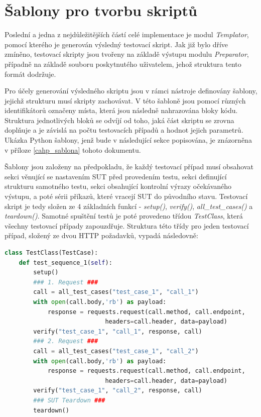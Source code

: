 \section{Šablony pro tvorbu skriptů}

Poslední a jedna z nejdůležitějších částí celé implementace je modul \textit{Templator}, pomocí kterého je generován výsledný testovací skript. Jak již bylo dříve zmíněno, testovací skripty jsou tvořeny na základě výstupu modulu \textit{Preparator}, případně na základě souboru poskytnutého uživatelem, jehož struktura tento formát dodržuje.

Pro účely generování výsledného skriptu jsou v rámci nástroje definovány šablony, jejichž strukturu musí skripty zachovávat. V této šabloně jsou pomocí různých identifikátorů označeny místa, která jsou následně nahrazována bloky kódu. Struktura jednotlivých bloků se odvíjí od toho, jaká část skriptu se zrovna doplňuje a je závislá na počtu testovacích případů a hodnot jejich parametrů. Ukázka Python šablony, jenž bude v následující sekce popisována, je znázorněna v příloze \ref{cahp_sablona} tohoto dokumentu.

Šablony jsou založeny na předpokladu, že každý testovací případ musí obsahovat sekci věnující se nastavením SUT před provedením testu, sekci definující strukturu samotného testu, sekci obsahující kontrolní výrazy očekávaného výstupu, a poté sérii příkazů, které vracejí SUT do původního stavu. Testovací skript je tedy složen ze 4 základních funkcí - \textit{setup()}, \textit{verify()}, \textit{all\_test\_cases()} a \textit{teardown()}. Samotné spuštění testů je poté provedeno třídou \textit{TestClass}, která všechny testovací případy zapouzdřuje. Struktura této třídy pro jeden testovací případ, složený ze dvou HTTP požadavků, vypadá následovně:
\begin{lstlisting}[language=Python, frame=single]
class TestClass(TestCase): 
    def test_sequence_1(self):
        setup()
        ### 1. Request ###
        call = all_test_cases("test_case_1", "call_1")
        with open(call.body,'rb') as payload:
            response = requests.request(call.method, call.endpoint, 
            				headers=call.header, data=payload)
        verify("test_case_1", "call_1", response, call)
        ### 2. Request ###
        call = all_test_cases("test_case_1", "call_2")
        with open(call.body,'rb') as payload:
            response = requests.request(call.method, call.endpoint, 
            				headers=call.header, data=payload)
        verify("test_case_1", "call_2", response, call)
        ### SUT Teardown ###
        teardown()
\end{lstlisting}

